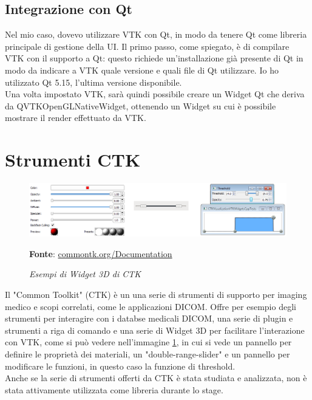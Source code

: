 \subsection{Integrazione con Qt}\label{sec:qt-integrazione}
Nel mio caso, dovevo utilizzare VTK con Qt, in modo da tenere Qt come libreria principale di gestione della UI. Il primo passo, come spiegato, è di compilare VTK con il supporto a Qt: questo richiede un'installazione già presente di Qt in modo da indicare a VTK quale versione e quali file di Qt utilizzare. Io ho utilizzato Qt 5.15, l'ultima versione disponibile.\\
Una volta impostato VTK, sarà quindi possibile creare un Widget Qt che deriva da QVTKOpenGLNativeWidget, ottenendo un Widget su cui è possibile mostrare il render effettuato da VTK.

\section{Strumenti CTK}
\begin{figure}[h]
    \centering
    \includegraphics[scale=0.35]{immagini/volumerendering/ctkwidgets.png}
    \caption{\textit{Esempi di Widget 3D di CTK}}
    \textbf{Fonte}: \href{https://commontk.org/index.php/Documentation/ImageGallery}{commontk.org/Documentation}
    \label{fig: CTK 3D Widgets}
\end{figure}

Il "Common Toolkit" (CTK) è un una serie di strumenti di supporto per imaging medico e scopi correlati, come le applicazioni DICOM. Offre per esempio degli strumenti per interagire con i databse medicali DICOM, una serie di plugin e strumenti a riga di comando e una serie di Widget 3D per facilitare l'interazione con VTK, come si può vedere nell'immagine \ref{fig: CTK 3D Widgets}, in cui si vede un pannello per definire le proprietà dei materiali, un "double-range-slider" e un pannello per modificare le funzioni, in questo caso la funzione di threshold.
\\
Anche se la serie di strumenti offerti da CTK è stata studiata e analizzata, non è stata attivamente utilizzata come libreria durante lo stage.

